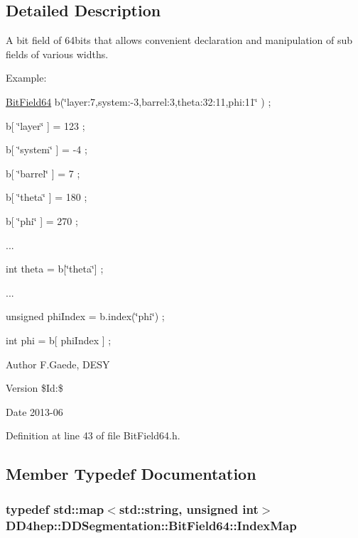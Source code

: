 \subsection{Detailed Description}
A bit field of 64bits that allows convenient declaration and manipulation of sub fields of various widths.\par
 Example:\par
 \hyperlink{class_d_d4hep_1_1_d_d_segmentation_1_1_bit_field64}{BitField64} b(\char`\"{}layer:7,system:-\/3,barrel:3,theta:32:11,phi:11\char`\"{} ) ; \par
 b\mbox{[} \char`\"{}layer\char`\"{} \mbox{]} = 123 ; \par
 b\mbox{[} \char`\"{}system\char`\"{} \mbox{]} = -\/4 ; \par
 b\mbox{[} \char`\"{}barrel\char`\"{} \mbox{]} = 7 ; \par
 b\mbox{[} \char`\"{}theta\char`\"{} \mbox{]} = 180 ; \par
 b\mbox{[} \char`\"{}phi\char`\"{} \mbox{]} = 270 ; \par
 ... \par
 int theta = b\mbox{[}\char`\"{}theta\char`\"{}\mbox{]} ; \par
 ... \par
 unsigned phiIndex = b.index(\char`\"{}phi\char`\"{}) ; \par
 int phi = b\mbox{[} phiIndex \mbox{]} ; \par


\begin{DoxyAuthor}{Author}
F.Gaede, DESY 
\end{DoxyAuthor}
\begin{DoxyVersion}{Version}
\$Id:\$ 
\end{DoxyVersion}
\begin{DoxyDate}{Date}
2013-\/06 
\end{DoxyDate}


Definition at line 43 of file BitField64.h.

\subsection{Member Typedef Documentation}
\hypertarget{class_d_d4hep_1_1_d_d_segmentation_1_1_bit_field64_a332cc613098802352470f92c7a7c71fd}{
\subsubsection[{IndexMap}]{\setlength{\rightskip}{0pt plus 5cm}typedef std::map$<$std::string, unsigned int$>$ {\bf DD4hep::DDSegmentation::BitField64::IndexMap}}}
\label{class_d_d4hep_1_1_d_d_segmentation_1_1_bit_field64_a332cc613098802352470f92c7a7c71fd}


